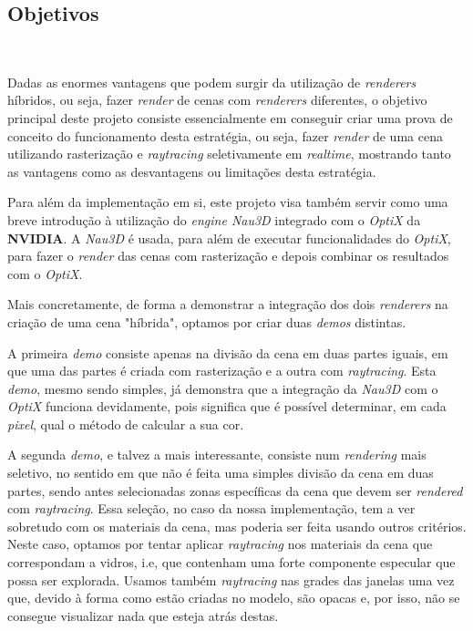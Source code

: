 \documentclass[10pt]{article}
\begin{document}
\subsection{Objetivos}~

Dadas as enormes vantagens que podem surgir da utilização de \textit{renderers} híbridos, ou seja, fazer \textit{render} de cenas com \textit{renderers} diferentes, o objetivo principal deste projeto consiste essencialmente em conseguir criar uma prova de conceito do funcionamento desta estratégia, ou seja, fazer \textit{render} de uma cena utilizando rasterização e \textit{raytracing} seletivamente em \textit{realtime}, mostrando tanto as vantagens como as desvantagens ou limitações desta estratégia.

Para além da implementação em si, este projeto visa também servir como uma breve introdução à utilização do \textit{engine Nau3D} integrado com o \textit{OptiX} da \textbf{NVIDIA}. A \textit{Nau3D} é usada, para além de executar funcionalidades do \textit{OptiX}, para fazer o \textit{render} das cenas com rasterização e depois combinar os resultados com o \textit{OptiX}.

Mais concretamente, de forma a demonstrar a integração dos dois \textit{renderers} na criação de uma cena "híbrida", optamos por criar duas \textit{demos} distintas.

A primeira \textit{demo} consiste apenas na divisão da cena em duas partes iguais, em que uma das partes é criada com rasterização e a outra com \textit{raytracing}. Esta \textit{demo}, mesmo sendo simples, já demonstra que a integração da \textit{Nau3D} com o \textit{OptiX} funciona devidamente, pois significa que é possível determinar, em cada \textit{pixel}, qual o método de calcular a sua cor.

A segunda \textit{demo}, e talvez a mais interessante, consiste num \textit{rendering} mais seletivo, no sentido em que não é feita uma simples divisão da cena em duas partes, sendo antes selecionadas zonas específicas da cena que devem ser \textit{rendered} com \textit{raytracing}. Essa seleção, no caso da nossa implementação, tem a ver sobretudo com os materiais da cena, mas poderia ser feita usando outros critérios. Neste caso, optamos por tentar aplicar \textit{raytracing} nos materiais da cena que correspondam a vidros, i.e, que contenham uma forte componente especular que possa ser explorada. Usamos também \textit{raytracing} nas grades das janelas uma vez que, devido à forma como estão criadas no modelo, são opacas e, por isso, não se consegue visualizar nada que esteja atrás destas.
\end{document}
